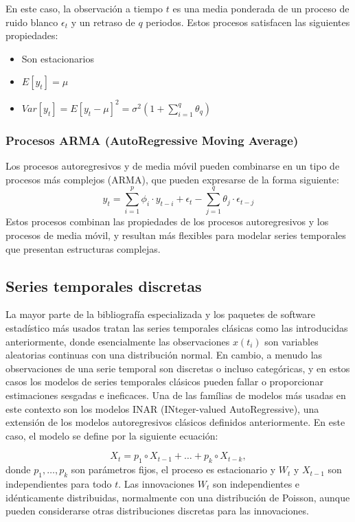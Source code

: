\documentclass[12pt,twoside]{article} %
\begin{document}
En este caso, la observación a tiempo $t$ es una media ponderada de un proceso de ruido blanco $\epsilon_t$ y un retraso de $q$ periodos. Estos procesos satisfacen las siguientes propiedades:
\begin{itemize}
 \item Son estacionarios
 \item $E[y_t]=\mu$
 \item $Var[y_t]=E[y_t-\mu]^2=\sigma^2 (1+\sum_{i=1}^q \theta_q)$
\end{itemize}

\subsubsection{Procesos ARMA (AutoRegressive Moving Average)}
Los procesos autoregresivos y de media móvil pueden combinarse en un tipo de procesos más complejos (ARMA), que pueden expresarse de la forma siguiente:
\begin{equation}
y_t = \sum_{i=1}^p \phi_i \cdot y_{t-i} + \epsilon_t - \sum_{j=1}^q \theta_j \cdot \epsilon_{t-j}
\end{equation}
Estos procesos combinan las propiedades de los procesos autoregresivos y los procesos de media móvil, y resultan más flexibles para modelar series temporales que presentan estructuras complejas.

\subsection{Series temporales discretas}
La mayor parte de la bibliografía especializada y los paquetes de software estadístico más usados tratan las series temporales clásicas como las introducidas anteriormente, donde esencialmente las observaciones $x(t_i)$ son variables aleatorias continuas con una distribución normal. En cambio, a menudo las observaciones de una serie temporal son discretas o incluso categóricas, y en estos casos los modelos de series temporales clásicos pueden fallar o proporcionar estimaciones sesgadas e ineficaces. Una de las famílias de modelos más usadas en este contexto son los modelos INAR (INteger-valued AutoRegressive), una extensión de los modelos autoregresivos clásicos definidos anteriormente. En este caso, el modelo se define por la siguiente ecuación:

\begin{equation}
X_t = p_1 \circ X_{t-1} + \ldots + p_k \circ X_{t-k},
\end{equation}
donde $p_1, \ldots, p_k$ son parámetros fijos, el proceso es estacionario y $W_t$ y $X_{t-1}$ son independientes para todo $t$. Las innovaciones $W_t$ son independientes e idénticamente distribuidas, normalmente con una distribución de Poisson, aunque pueden considerarse otras distribuciones discretas para las innovaciones.
\end{document}
